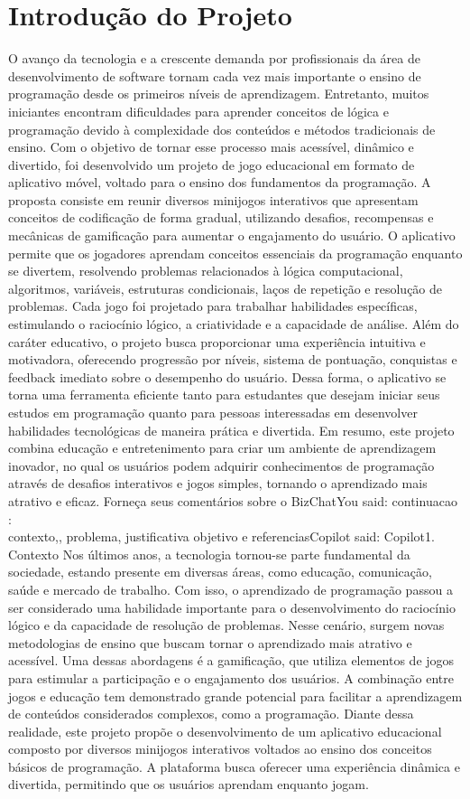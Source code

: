 \documentclass{article}
\begin{document}
\section{Introdução do Projeto}
O avanço da tecnologia e a crescente demanda por profissionais da área de desenvolvimento de software tornam cada vez mais importante o ensino de programação desde os primeiros níveis de aprendizagem. Entretanto, muitos iniciantes encontram dificuldades para aprender conceitos de lógica e programação devido à complexidade dos conteúdos e métodos tradicionais de ensino.
Com o objetivo de tornar esse processo mais acessível, dinâmico e divertido, foi desenvolvido um projeto de jogo educacional em formato de aplicativo móvel, voltado para o ensino dos fundamentos da programação. A proposta consiste em reunir diversos minijogos interativos que apresentam conceitos de codificação de forma gradual, utilizando desafios, recompensas e mecânicas de gamificação para aumentar o engajamento do usuário.
O aplicativo permite que os jogadores aprendam conceitos essenciais da programação enquanto se divertem, resolvendo problemas relacionados à lógica computacional, algoritmos, variáveis, estruturas condicionais, laços de repetição e resolução de problemas. Cada jogo foi projetado para trabalhar habilidades específicas, estimulando o raciocínio lógico, a criatividade e a capacidade de análise.
Além do caráter educativo, o projeto busca proporcionar uma experiência intuitiva e motivadora, oferecendo progressão por níveis, sistema de pontuação, conquistas e feedback imediato sobre o desempenho do usuário. Dessa forma, o aplicativo se torna uma ferramenta eficiente tanto para estudantes que desejam iniciar seus estudos em programação quanto para pessoas interessadas em desenvolver habilidades tecnológicas de maneira prática e divertida.
Em resumo, este projeto combina educação e entretenimento para criar um ambiente de aprendizagem inovador, no qual os usuários podem adquirir conhecimentos de programação através de desafios interativos e jogos simples, tornando o aprendizado mais atrativo e eficaz.
Forneça seus comentários sobre o BizChatYou said: continuacao : \\contexto,, problema, justificativa objetivo e referenciasCopilot said: Copilot1. Contexto
Nos últimos anos, a tecnologia tornou-se parte fundamental da sociedade, estando presente em diversas áreas, como educação, comunicação, saúde e mercado de trabalho. Com isso, o aprendizado de programação passou a ser considerado uma habilidade importante para o desenvolvimento do raciocínio lógico e da capacidade de resolução de problemas.
Nesse cenário, surgem novas metodologias de ensino que buscam tornar o aprendizado mais atrativo e acessível. Uma dessas abordagens é a gamificação, que utiliza elementos de jogos para estimular a participação e o engajamento dos usuários. A combinação entre jogos e educação tem demonstrado grande potencial para facilitar a aprendizagem de conteúdos considerados complexos, como a programação.
Diante dessa realidade, este projeto propõe o desenvolvimento de um aplicativo educacional composto por diversos minijogos interativos voltados ao ensino dos conceitos básicos de programação. A plataforma busca oferecer uma experiência dinâmica e divertida, permitindo que os usuários aprendam enquanto jogam.
\end{document}
